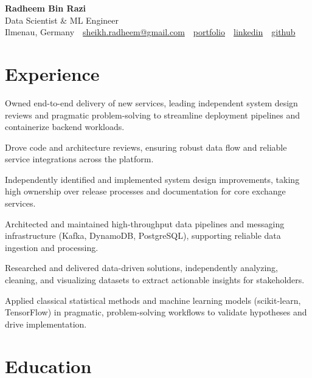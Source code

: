 \documentclass[11pt,a4paper]{resume}
\makeatletter
\newcommand{\Portfolio}{https://radheem.github.io/my-cv}
\newcommand{\PortfolioText}{portfolio}
\newcommand{\GitHub}{https://github.com/radheem}
\newcommand{\LinkedIn}{https://www.linkedin.com/in/radheem-razi}
\newcommand{\Email}{sheikh.radheem@gmail.com}
\makeatother
\begin{document}
\begin{center}
  {\huge\bfseries Radheem Bin Razi}\\[3pt]
  {\large Data Scientist \& ML Engineer}\\[6pt]
  \small
  Ilmenau, Germany \,\textbar\,
  \href{mailto:\Email}{\Email} \,\textbar\,
  \href{\Portfolio}{\PortfolioText} \,\textbar\,
  \href{\LinkedIn}{linkedin} \,\textbar\,
  \href{\GitHub}{github}
\end{center}
\vspace{2pt}

\section{Experience}

\bullets
  \item Owned end-to-end delivery of new services, leading independent system design reviews and pragmatic problem-solving to streamline deployment pipelines and containerize backend workloads.
  \item Drove code and architecture reviews, ensuring robust data flow and reliable service integrations across the platform.
\bulletsend
\vspace{3pt}
\bullets
  \item Independently identified and implemented system design improvements, taking high ownership over release processes and documentation for core exchange services.
  \item Architected and maintained high-throughput data pipelines and messaging infrastructure (Kafka, DynamoDB, PostgreSQL), supporting reliable data ingestion and processing.
\bulletsend
\vspace{3pt}
\bullets
  \item Researched and delivered data-driven solutions, independently analyzing, cleaning, and visualizing datasets to extract actionable insights for stakeholders.
  \item Applied classical statistical methods and machine learning models (scikit-learn, TensorFlow) in pragmatic, problem-solving workflows to validate hypotheses and drive implementation.
\bulletsend
\vspace{3pt}

\section{Education}
\end{document}
